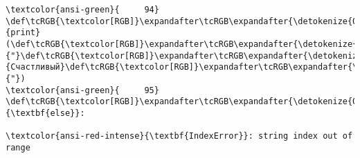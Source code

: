 \documentclass[11pt]{article}
\makeatletter
\newcommand{\boxspacing}{\kern\kvtcb@left@rule\kern\kvtcb@boxsep}
\newcommand{\prompt}[4]{
        {\ttfamily\llap{{\color{#2}[#3]:\hspace{3pt}#4}}\vspace{-\baselineskip}}
    }
\makeatother
\begin{document}
\begin{Verbatim}[commandchars=\\\{\}, frame=single, framerule=2mm, rulecolor=\color{outerrorbackground}]
\textcolor{ansi-green}{     94}     \def\tcRGB{\textcolor[RGB]}\expandafter\tcRGB\expandafter{\detokenize{0,135,0}}{print}(\def\tcRGB{\textcolor[RGB]}\expandafter\tcRGB\expandafter{\detokenize{175,0,0}}{"}\def\tcRGB{\textcolor[RGB]}\expandafter\tcRGB\expandafter{\detokenize{175,0,0}}{Счастливый}\def\tcRGB{\textcolor[RGB]}\expandafter\tcRGB\expandafter{\detokenize{175,0,0}}{"})
\textcolor{ansi-green}{     95} \def\tcRGB{\textcolor[RGB]}\expandafter\tcRGB\expandafter{\detokenize{0,135,0}}{\textbf{else}}:

\textcolor{ansi-red-intense}{\textbf{IndexError}}: string index out of range
    \end{Verbatim}

    \begin{tcolorbox}[breakable, size=fbox, boxrule=1pt, pad at break*=1mm,colback=cellbackground, colframe=cellborder]
\prompt{In}{incolor}{ }{\boxspacing}
\begin{Verbatim}[commandchars=\\\{\}]

\end{Verbatim}
\end{tcolorbox}


    
    
    
\end{document}
